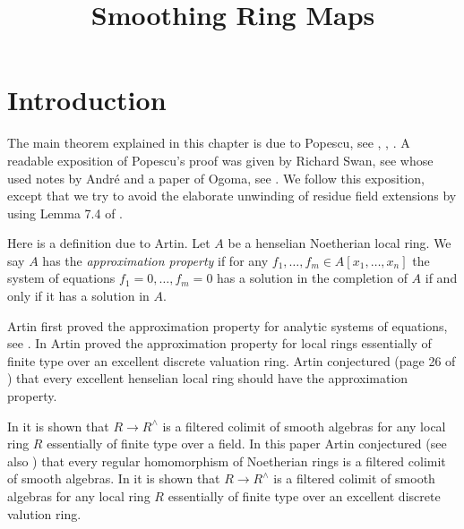 

%


\title{Smoothing Ring Maps}


\maketitle

\label{section-phantom}

\tableofcontents

\section{Introduction}
\label{section-introduction}

\noindent
The main theorem explained in this chapter is due to
Popescu, see \cite{popescu-letter}, \cite{popescu-GND}, \cite{popescu-GNDA}.
A readable exposition of Popescu's proof was given by Richard Swan,
see \cite{swan} whose used notes by Andr\'e and a paper of Ogoma, see
\cite{Ogoma}.
We follow this exposition, except that we try to avoid the elaborate
unwinding of residue field extensions by using
Lemma 7.4 of \cite{popescu-GNDA}.

\medskip\noindent
Here is a definition due to Artin.
Let $A$ be a henselian Noetherian local ring. We say $A$ has the
{\it approximation property} if for any
$f_1, \ldots, f_m \in A[x_1, \ldots, x_n]$
the system of equations
$f_1 = 0, \ldots, f_m = 0$ has a solution in the completion
of $A$ if and only if it has a solution in $A$.

\medskip\noindent
Artin first proved the approximation property for analytic systems of
equations, see \cite{Artin-Analytic-Approximation}.
In \cite{Artin-Algebraic-Approximation} Artin proved the
approximation property for local rings
essentially of finite type over an excellent discrete valuation ring.
Artin conjectured (page 26 of \cite{Artin-Algebraic-Approximation})
that every excellent henselian local ring should have the
approximation property.

\medskip\noindent
In \cite{Artin-power-series} it is shown that
$R \to R^\wedge$ is a filtered colimit of smooth algebras for any
local ring $R$ essentially of finite type over a field.
In this paper Artin conjectured (see also \cite{Artin-Denef})
that every regular homomorphism of Noetherian rings is a
filtered colimit of smooth algebras.
In \cite{Rotthaus-Artin} it is shown that $R \to R^\wedge$
is a filtered colimit of smooth algebras for any local ring $R$
essentially of finite type over an excellent discrete valution ring.

